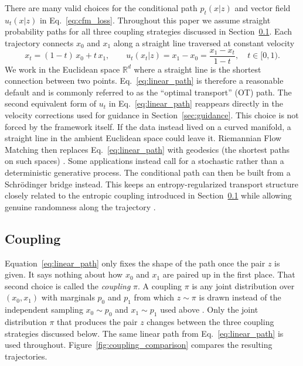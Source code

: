 \documentclass{article}
\begin{document}
There are many valid choices for the conditional path $p_t(x|z)$ and vector field $u_t(x|z)$ in Eq.~\eqref{eq:cfm_loss}.
Throughout this paper we assume straight probability paths for all three coupling strategies discussed in Section~\ref{sec:coupling}.
Each trajectory connects $x_0$ and $x_1$ along a straight line traversed at constant velocity
\begin{equation}
    x_t = (1-t)\,x_0 + t\,x_1, \qquad u_t(x_t|z) = x_1 - x_0 = \frac{x_1 - x_t}{1-t}, \quad t \in [0,1).
    \label{eq:linear_path}
\end{equation}
We work in the Euclidean space $\mathbb{R}^d$ where a straight line is the shortest connection between two points.
Eq.~\eqref{eq:linear_path} is therefore a reasonable default and is commonly referred to as the ``optimal transport'' (OT) path.
The second equivalent form of $u_t$ in Eq.~\eqref{eq:linear_path} reappears directly in the velocity corrections used for guidance in Section~\ref{sec:guidance}.
This choice is not forced by the framework itself.
If the data instead lived on a curved manifold, a straight line in the ambient Euclidean space could leave it.
Riemannian Flow Matching then replaces Eq.~\eqref{eq:linear_path} with geodesics (the shortest paths on such spaces) \citep{chen2024flow}.
Some applications instead call for a stochastic rather than a deterministic generative process.
The conditional path can then be built from a Schr\"odinger bridge instead.
This keeps an entropy-regularized transport structure closely related to the entropic coupling introduced in Section~\ref{sec:coupling} while allowing genuine randomness along the trajectory \citep{tong2024improving}.

\subsection{Coupling}
\label{sec:coupling}

Equation~\eqref{eq:linear_path} only fixes the shape of the path once the pair $z$ is given.
It says nothing about how $x_0$ and $x_1$ are paired up in the first place.
That second choice is called the \emph{coupling} $\pi$.
A coupling $\pi$ is any joint distribution over $(x_0,x_1)$ with marginals $p_0$ and $p_1$ from which $z \sim \pi$ is drawn instead of the independent sampling $x_0\sim p_0$ and $x_1 \sim p_1$ used above \citep{tong2024improving}.
Only the joint distribution $\pi$ that produces the pair $z$ changes between the three coupling strategies discussed below.
The same linear path from Eq.~\eqref{eq:linear_path} is used throughout.
Figure~\ref{fig:coupling_comparison} compares the resulting trajectories.
\end{document}
